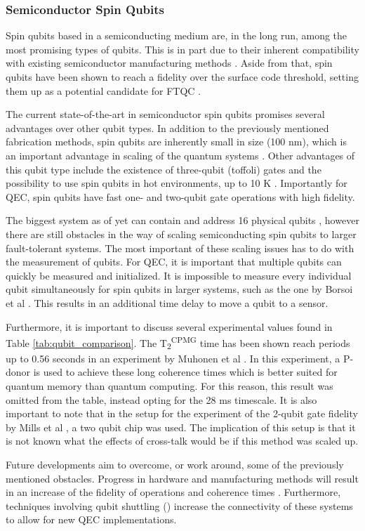 \subsubsection{Semiconductor Spin Qubits}

Spin qubits based in a semiconducting medium are, in the long run, among the most promising types of qubits. This is in part due to their inherent compatibility with existing semiconductor manufacturing methods \cite{Zwerver_2022}. Aside from that, spin qubits have been shown to reach a fidelity over the surface code threshold, setting them up as a potential candidate for FTQC \cite{Xue_2022}.

The current state-of-the-art in semiconductor spin qubits promises several advantages over other qubit types. In addition to the previously mentioned fabrication methods, spin qubits are inherently small in size (100 nm), which is an important advantage in scaling of the quantum systems \cite{Neyens_2024}.
Other advantages of this qubit type include the existence of three-qubit (toffoli) gates \cite{Stano_2022} and the possibility to use spin qubits in hot environments, up to 10 K \cite{Ono_2019}.
Importantly for QEC, spin qubits have fast one- and two-qubit gate operations with high fidelity.

The biggest system as of yet can contain and address 16 physical qubits \cite{Borsoi_2023}, however there are still obstacles in the way of scaling semiconducting spin qubits to larger fault-tolerant systems. The most important of these scaling issues has to do with the measurement of qubits. For QEC, it is important that multiple qubits can quickly be measured and initialized. It is impossible to measure every individual qubit simultaneously for spin qubits in larger systems, such as the one by Borsoi et al \cite{Borsoi_2023}. This results in an additional time delay to move a qubit to a sensor.

Furthermore, it is important to discuss several experimental values found in Table \ref{tab:qubit_comparison}.
The T\textsubscript{2}\textsuperscript{CPMG} time has been shown reach periods up to 0.56 seconds in an experiment by Muhonen et al \cite{Muhonen_2014}. In this experiment, a P-donor is used to achieve these long coherence times which is better suited for quantum memory than quantum computing. For this reason, this result was omitted from the table, instead opting for the 28 ms timescale.
It is also important to note that in the setup for the experiment of the 2-qubit gate fidelity by Mills et al \cite{Mills_2022}, a two qubit chip was used. The implication of this setup is that it is not known what the effects of cross-talk would be if this method was scaled up.

Future developments aim to overcome, or work around, some of the previously mentioned obstacles. Progress in hardware and manufacturing methods will result in an increase of the fidelity of operations and coherence times \cite{Stano_2022}. Furthermore, techniques involving qubit shuttling (\cite{Knne_2024}) increase the connectivity of these systems to allow for new QEC implementations.
